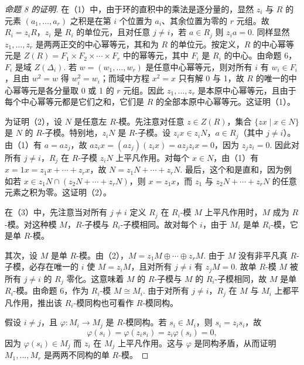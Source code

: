 \begin{proof}[命题 8 的证明]
在（1）中，由于环的直积中的乘法是逐分量的，显然 \(z_i\) 与 \(R\) 的元素 \((a_1, \ldots, a_r)\) 之积是在第 \(i\) 个位置为 \(a_i\)、其余位置为零的 \(r\) 元组。故 \(R_i = z_iR\)，\(z_i\) 是 \(R_i\) 的单位元，且对任意 \(j \neq i\)，若 \(a \in R_j\) 则 \(z_ia = 0\). 同样显然 \(z_1, \ldots, z_r\) 是两两正交的中心幂等元，其和为 \(R\) 的单位元。按定义，\(R\) 的中心幂等元是 \(Z(R) = F_1 \times F_2 \times \cdots \times F_r\) 中的幂等元，其中 \(F_i\) 是 \(R_i\) 的中心。由命题 6，\(F_i\) 是域 \(Z(\Delta_i)\). 若 \(w = (w_1, \ldots, w_r)\) 是任意中心幂等元，则对所有 \(i\) 有 \(w_i \in F_i\)，且由 \(w^2 = w\) 得 \(w_i^2 = w_i\)；而域中方程 \(x^2 = x\) 只有解 0 与 1，故 \(R\) 的唯一的中心幂等元是各分量取 0 或 1 的 \(r\) 元组。因此 \(z_1, \ldots, z_r\) 是本原中心幂等元，且由于每个中心幂等元都是它们之和，它们是 \(R\) 的全部本原中心幂等元。这证明（1）。

为证明（2），设 \(N\) 是任意左 \(R\)-模。先注意对任意 \(z \in Z(R)\)，集合 \(\{zx \mid x \in N\}\) 是 \(N\) 的 \(R\)-子模。特别地，\(z_iN\) 是 \(R\)-子模。设 \(z_ix \in z_iN\)，\(a \in R_j\)（其中 \(j \neq i\)）。由（1）有 \(a = az_j\)，故 \(az_ix = (az_j)(z_ix) = az_jz_ix = 0\)，因为 \(z_jz_i = 0\). 因此对所有 \(j \neq i\)，\(R_j\) 在 \(R\)-子模 \(z_iN\) 上平凡作用。对每个 \(x \in N\)，由（1）有 \(x = 1x = z_1x + \cdots + z_rx\)，故 \(N = z_1N + \cdots + z_rN\). 最后，这个和是直和，因为例如若 \(x \in z_1N \cap (z_2N + \cdots + z_rN)\)，则 \(x = z_1x\)，而 \(z_1\) 与 \(z_2N + \cdots + z_rN\) 的任意元素之积为零。这证明（2）。

在（3）中，先注意当对所有 \(j \neq i\) 定义 \(R_j\) 在 \(R_i\)-模 \(M\) 上平凡作用时，\(M\) 成为 \(R\)-模。对这种模 \(M\)，\(R\)-子模与 \(R_i\)-子模相同。故对每个 \(i\)，由于 \(M_i\) 是单 \(R_i\)-模，它是单 \(R\)-模。

其次，设 \(M\) 是单 \(R\)-模。由（2），\(M = z_1M \oplus \cdots \oplus z_rM\). 由于 \(M\) 没有非平凡真 \(R\)-子模，必存在唯一的 \(i\) 使 \(M = z_iM\)，且对所有 \(j \neq i\) 有 \(z_jM = 0\). 故单 \(R\)-模 \(M\) 被所有 \(j \neq i\) 的 \(R_j\) 零化。这意味着 \(M\) 的 \(R\)-子模与 \(M\) 的 \(R_i\)-子模相同，故 \(M\) 是单 \(R_i\)-模。由命题 6，作为 \(R_i\)-模 \(M \cong M_i\). 由于对所有 \(j \neq i\)，\(R_j\) 在 \(M\) 与 \(M_i\) 上都平凡作用，推出该 \(R_i\)-模同构也可看作 \(R\)-模同构。

假设 \(i \neq j\)，且 \(\varphi : M_i \to M_j\) 是 \(R\)-模同构。若 \(s_i \in M_i\)，则 \(s_i = z_is_i\)，故
\[
\varphi(s_i) = \varphi(z_is_i) = z_i\varphi(s_i) = 0,
\]
因为 \(\varphi(s_i) \in M_j\) 而 \(z_i\) 在 \(M_j\) 上平凡作用。这与 \(\varphi\) 是同构矛盾，从而证明 \(M_1, \ldots, M_r\) 是两两不同构的单 \(R\)-模。


\end{proof}
